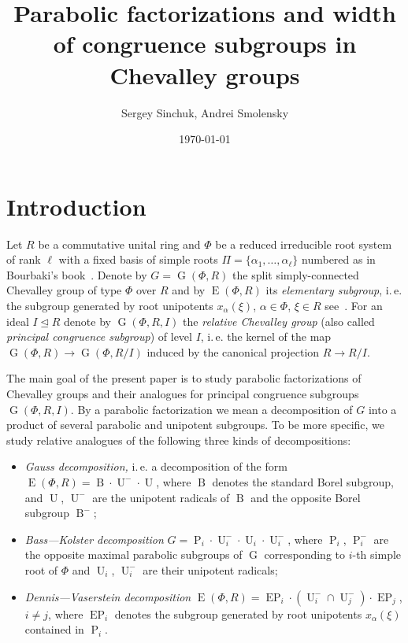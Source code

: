\documentclass[12pt]{amsart}
\title [Parabolic factorizations of congruence subgroups] {Parabolic factorizations and width of congruence subgroups in Chevalley groups}
\author {Sergey Sinchuk, Andrei Smolensky}
\date {\today}
\theoremstyle{plain} \declaretheorem[name=Theorem, Refname={Theorem,Theorems}]{thm} \Crefname{thm}{Theorem}{Theorems}
\numberwithin{equation}{section}
\theoremstyle{definition} \newtheorem{dfn}[lemma]{Definition} \Crefname{dfn}{Definition}{Definitions}
\theoremstyle{remark} \newtheorem{rem}[lemma]{Remark} \Crefname{rem}{Remark}{Remarks}
\DeclareMathOperator{\G}{G}
\DeclareMathOperator{\E}{E}
\DeclareMathOperator{\EP}{EP}
\DeclareMathOperator{\Par}{P}
\DeclareMathOperator{\B}{B}
\DeclareMathOperator{\U}{U}
\begin{document}

\maketitle

\section{Introduction}\label{sec:intro}
Let $R$ be a commutative unital ring and $\Phi$ be a reduced irreducible root system of rank $\ell$ with a fixed basis of simple roots $\Pi=\{\alpha_1,\ldots, \alpha_\ell\}$ numbered as in Bourbaki's book~\cite{Bou}.
Denote by $G=\G(\Phi, R)$ the split simply-connected Chevalley group of type $\Phi$ over $R$ and by $\E(\Phi, R)$ its \emph{elementary subgroup}, 
i.\,e. the subgroup generated by root unipotents $x_\alpha(\xi)$, $\alpha\in\Phi$, $\xi\in R$ see~\cite{VP, St78, S}.
For an ideal $I \trianglelefteq R$ denote by $\G(\Phi, R, I)$ the \emph{relative Chevalley group} (also called \emph{principal congruence subgroup}) of level $I$, 
i.\,e. the kernel of the map $\G(\Phi, R)\rightarrow\G(\Phi, R/I)$ induced by the canonical projection $R\rightarrow R/I$.

The main goal of the present paper is to study parabolic factorizations of Chevalley groups and their analogues for principal congruence subgroups $\G(\Phi, R, I)$.
By a parabolic factorization we mean a decomposition of $G$ into a product of several parabolic and unipotent subgroups.
To be more specific, we study relative analogues of the following three kinds of decompositions:
\begin{itemize}
\item \emph{Gauss decomposition,} i.\,e. a decomposition of the form $\E(\Phi,R)=\B \cdot \U^- \cdot \U$, where $\B$ denotes the standard Borel subgroup,
      and $\U$, $\U^-$ are the unipotent radicals of $\B$ and the opposite Borel subgroup $\B^-$;
\item \emph{Bass---Kolster decomposition} $G = \Par_i \cdot \U_i^- \cdot \U_i \cdot \U_i^-$, where 
      $\Par_i$, $\Par_i^-$ are the opposite maximal parabolic subgroups of $\G$ corresponding to $i$-th simple root of $\Phi$ and $\U_i$, $\U_i^-$ are their unipotent radicals;
\item \emph{Dennis---Vaserstein decomposition} $\E(\Phi, R) = \EP_i \cdot (\U_i^- \cap \U_j^-) \cdot \EP_j$, $i\neq j$,
      where $\EP_i$ denotes the subgroup generated by root unipotents $x_\alpha(\xi)$ contained in $\Par_i$.
\end{itemize}
\end{document}
